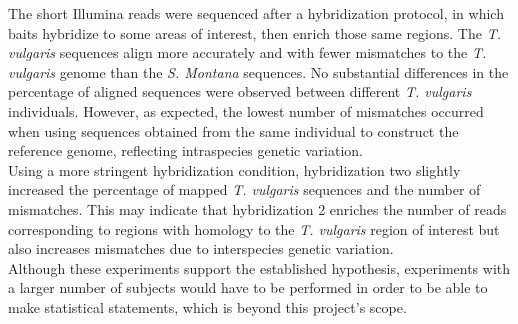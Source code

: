 The short Illumina reads were sequenced after a hybridization protocol, in which baits hybridize to some areas of interest, then enrich those same regions. The \textit{T. vulgaris} sequences align more accurately and with fewer mismatches to the \textit{T. vulgaris} genome than the \textit{S. Montana} sequences. No substantial differences in the percentage of aligned sequences were observed between different \textit{T. vulgaris} individuals. However, as expected, the lowest number of mismatches occurred when using sequences obtained from the same individual to construct the reference genome, reflecting intraspecies genetic variation.\\

Using a more stringent hybridization condition, hybridization two slightly increased the percentage of mapped \textit{T. vulgaris} sequences and the number of mismatches. This may indicate that hybridization 2 enriches the number of reads corresponding to regions with homology to the \textit{T. vulgaris} region of interest but also increases mismatches due to interspecies genetic variation.\\

Although these experiments support the established hypothesis, experiments with a larger number of subjects would have to be performed in order to be able to make statistical statements, which is beyond this project's scope.\\